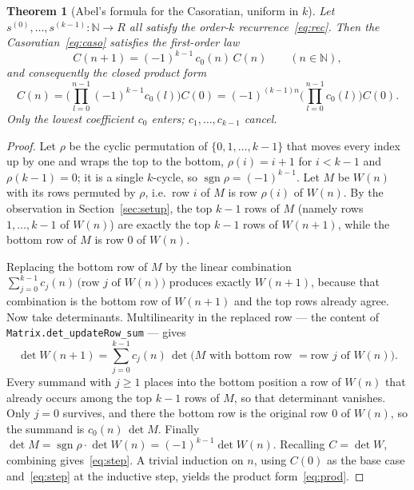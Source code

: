 \documentclass[11pt]{article}
\newtheorem{theorem}{Theorem}
\newcommand{\N}{\mathbb{N}}
\newcommand{\Caso}{C}
\newcommand{\CasoM}{W}
\DeclareMathOperator{\sgn}{sgn}
\begin{document}
\begin{theorem}[Abel's formula for the Casoratian, uniform in $k$]\label{thm:ajl}
Let $s^{(0)},\dots,s^{(k-1)}\colon\N\to R$ all satisfy the order-$k$
recurrence~\eqref{eq:rec}. Then the Casoratian~\eqref{eq:caso} satisfies the
first-order law
\begin{equation}\label{eq:step}
  \Caso(n+1)=(-1)^{k-1}\,c_0(n)\,\Caso(n)\qquad(n\in\N),
\end{equation}
and consequently the closed product form
\begin{equation}\label{eq:prod}
  \Caso(n)=\Bigg(\prod_{l=0}^{n-1}(-1)^{k-1}c_0(l)\Bigg)\Caso(0)
          =(-1)^{(k-1)n}\Bigg(\prod_{l=0}^{n-1}c_0(l)\Bigg)\Caso(0).
\end{equation}
Only the lowest coefficient $c_0$ enters; $c_1,\dots,c_{k-1}$ cancel.
\end{theorem}

\begin{proof}
Let $\rho$ be the cyclic permutation of $\{0,1,\dots,k-1\}$ that moves every index up
by one and wraps the top to the bottom, $\rho(i)=i+1$ for $i<k-1$ and
$\rho(k-1)=0$; it is a single $k$-cycle, so $\sgn\rho=(-1)^{k-1}$. Let $M$ be
$\CasoM(n)$ with its rows permuted by $\rho$, i.e.\ row $i$ of $M$ is row $\rho(i)$ of
$\CasoM(n)$. By the observation in Section~\ref{sec:setup}, the top $k-1$ rows of $M$
(namely rows $1,\dots,k-1$ of $\CasoM(n)$) are exactly the top $k-1$ rows of
$\CasoM(n+1)$, while the bottom row of $M$ is row $0$ of $\CasoM(n)$.

Replacing the bottom row of $M$ by the linear combination
$\sum_{j=0}^{k-1}c_j(n)\,\big(\text{row }j\text{ of }\CasoM(n)\big)$ produces exactly
$\CasoM(n+1)$, because that combination is the bottom row of $\CasoM(n+1)$ and the top
rows already agree. Now take determinants. Multilinearity in the replaced row --- the
content of \texttt{Matrix.det\_updateRow\_sum} --- gives
\[
  \det\CasoM(n+1)
   =\sum_{j=0}^{k-1}c_j(n)\,\det\!\big(M\text{ with bottom row }=\text{row }j\text{ of }\CasoM(n)\big).
\]
Every summand with $j\ge1$ places into the bottom position a row of $\CasoM(n)$ that
already occurs among the top $k-1$ rows of $M$, so that determinant vanishes. Only
$j=0$ survives, and there the bottom row is the original row $0$ of $\CasoM(n)$, so the
summand is $c_0(n)\,\det M$. Finally $\det M=\sgn\rho\cdot\det\CasoM(n)
=(-1)^{k-1}\det\CasoM(n)$. Recalling $\Caso=\det\CasoM$, combining gives~\eqref{eq:step}.
A trivial induction on $n$, using $\Caso(0)$ as the base case and~\eqref{eq:step} at the
inductive step, yields the product form~\eqref{eq:prod}.
\end{proof}
\end{document}
